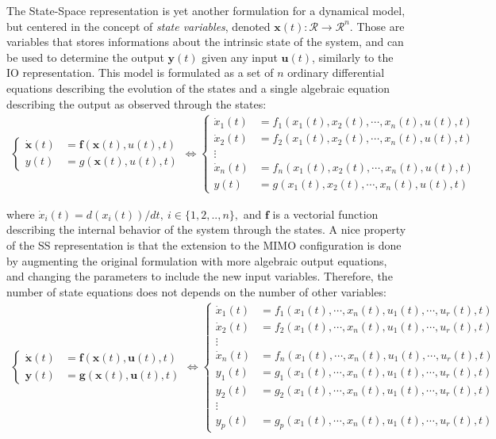 \documentclass[a4paper,11pt]{book}
\numberwithin{figure}{chapter}
\numberwithin{equation}{chapter}
\numberwithin{table}{chapter}
\theoremstyle{definition}
\begin{document}
The State-Space representation is yet another formulation for a dynamical model, but centered in the concept of \textit{state variables}, denoted $\mathbf{x}(t) : \mathcal{R} \rightarrow \mathcal{R}^n$. Those are variables that stores informations about the intrinsic state of the system, and can be used to determine the output $\mathbf{y}(t)$ given any input $\mathbf{u}(t)$, similarly to the IO representation. This model is formulated as a set of $n$ ordinary differential equations describing the evolution of the states and a single algebraic equation describing the output as observed through the states: 
\begin{align} \label{eq:SSRepr01}
\begin{cases}
	\dot{\mathbf{x}}(t) &= \mathbf{f}(\mathbf{x}(t), u(t), t) \\
	y(t) &= g(\mathbf{x}(t), u(t), t) 	
\end{cases} \Leftrightarrow \begin{cases}
	\dot{x}_1(t) &= f_1(x_1(t), x_2(t), \cdots, x_n(t), u(t), t) \\
	\dot{x}_2(t) &= f_2(x_1(t), x_2(t), \cdots, x_n(t), u(t), t) \\
	 \vdots \\
	\dot{x}_n(t) &= f_n(x_1(t), x_2(t), \cdots, x_n(t), u(t), t) \\
	y(t) &= g(x_1(t), x_2(t), \cdots, x_n(t), u(t), t) 
\end{cases}
\end{align}

\noindent where $\dot{x}_i(t) = d(x_i(t))/dt,\ i \in \{1,2,..,n\},$ and $\mathbf{f}$ is a vectorial function describing the internal behavior of the system through the states. A nice property of the SS representation is that the extension to the MIMO configuration is done by augmenting the original formulation with more algebraic output equations, and changing the parameters to include the new input variables. Therefore, the number of state equations does not depends on the number of other variables:
\begin{align} \label{eq:SSRepr02}
\begin{cases}
	\dot{\mathbf{x}}(t) &= \mathbf{f}(\mathbf{x}(t), \mathbf{u}(t), t) \\
	\mathbf{y}(t) &= \mathbf{g}(\mathbf{x}(t), \mathbf{u}(t), t) 	
\end{cases} \Leftrightarrow \begin{cases}
	\dot{x}_1(t) &= f_1(x_1(t), \cdots, x_n(t), u_1(t), \cdots, u_r(t), t) \\
	\dot{x}_2(t) &= f_2(x_1(t), \cdots, x_n(t), u_1(t), \cdots, u_r(t), t) \\
	 \vdots \\
	\dot{x}_n(t) &= f_n(x_1(t), \cdots, x_n(t), u_1(t), \cdots, u_r(t), t) \\
	y_1(t) &= g_1(x_1(t), \cdots, x_n(t), u_1(t), \cdots, u_r(t), t) \\
	y_2(t) &= g_2(x_1(t), \cdots, x_n(t), u_1(t), \cdots, u_r(t), t) \\
	\vdots \\
	y_p(t) &= g_p(x_1(t), \cdots, x_n(t), u_1(t), \cdots, u_r(t), t) 
\end{cases}
\end{align}
\end{document}
